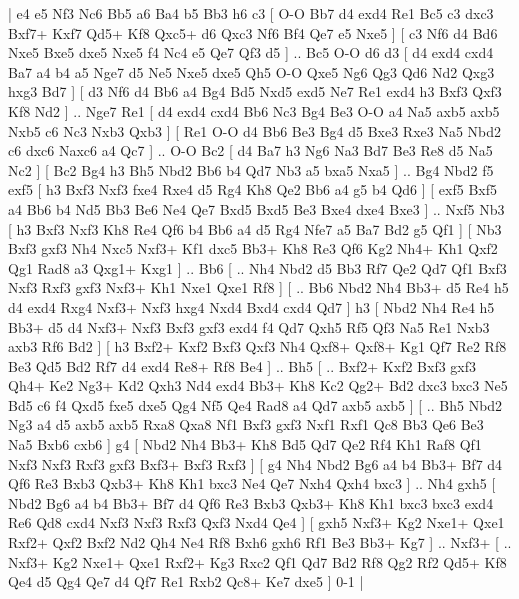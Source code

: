 \makegametitle 
|   e4   e5    Nf3   Nc6    Bb5   a6    Ba4   b5    Bb3   h6    c3 [  O-O Bb7  d4 exd4  Re1 Bc5  c3 dxc3  Bxf7+ Kxf7  Qd5+ Kf8  Qxc5+ d6  Qxc3 Nf6  Bf4 Qe7  e5 Nxe5   ]  [  c3 Nf6  d4 Bd6  Nxe5 Bxe5  dxe5 Nxe5  f4 Nc4  e5 Qe7  Qf3 d5   ] .. Bc5    O-O   d6    d3 [  d4 exd4  cxd4 Ba7  a4 b4  a5 Nge7  d5 Ne5  Nxe5 dxe5  Qh5 O-O  Qxe5 Ng6  Qg3 Qd6  Nd2 Qxg3  hxg3 Bd7   ]  [  d3 Nf6  d4 Bb6  a4 Bg4  Bd5 Nxd5  exd5 Ne7  Re1 exd4  h3 Bxf3  Qxf3 Kf8  Nd2   ] .. Nge7    Re1 [  d4 exd4  cxd4 Bb6  Nc3 Bg4  Be3 O-O  a4 Na5  axb5 axb5  Nxb5 c6  Nc3 Nxb3  Qxb3   ]  [  Re1 O-O  d4 Bb6  Be3 Bg4  d5 Bxe3  Rxe3 Na5  Nbd2 c6  dxc6 Naxc6  a4 Qc7   ] .. O-O    Bc2 [  d4 Ba7  h3 Ng6  Na3 Bd7  Be3 Re8  d5 Na5  Nc2   ]  [  Bc2 Bg4  h3 Bh5  Nbd2 Bb6  b4 Qd7  Nb3 a5  bxa5 Nxa5   ] .. Bg4    Nbd2   f5    exf5 [  h3 Bxf3  Nxf3 fxe4  Rxe4 d5  Rg4 Kh8  Qe2 Bb6  a4 g5  b4 Qd6   ]  [  exf5 Bxf5  a4 Bb6  b4 Nd5  Bb3 Be6  Ne4 Qe7  Bxd5 Bxd5  Be3 Bxe4  dxe4 Bxe3   ] .. Nxf5    Nb3 [  h3 Bxf3  Nxf3 Kh8  Re4 Qf6  b4 Bb6  a4 d5  Rg4 Nfe7  a5 Ba7  Bd2 g5  Qf1   ]  [  Nb3 Bxf3  gxf3 Nh4  Nxc5 Nxf3+  Kf1 dxc5  Bb3+ Kh8  Re3 Qf6  Kg2 Nh4+  Kh1 Qxf2  Qg1 Rad8  a3 Qxg1+  Kxg1   ] .. Bb6 [ .. Nh4  Nbd2 d5  Bb3 Rf7  Qe2 Qd7  Qf1 Bxf3  Nxf3 Rxf3  gxf3 Nxf3+  Kh1 Nxe1  Qxe1 Rf8   ]  [ .. Bb6  Nbd2 Nh4  Bb3+ d5  Re4 h5  d4 exd4  Rxg4 Nxf3+  Nxf3 hxg4  Nxd4 Bxd4  cxd4 Qd7   ]  h3 [  Nbd2 Nh4  Re4 h5  Bb3+ d5  d4 Nxf3+  Nxf3 Bxf3  gxf3 exd4  f4 Qd7  Qxh5 Rf5  Qf3 Na5  Re1 Nxb3  axb3 Rf6  Bd2   ]  [  h3 Bxf2+  Kxf2 Bxf3  Qxf3 Nh4  Qxf8+ Qxf8+  Kg1 Qf7  Re2 Rf8  Be3 Qd5  Bd2 Rf7  d4 exd4  Re8+ Rf8  Be4   ] .. Bh5 [ .. Bxf2+  Kxf2 Bxf3  gxf3 Qh4+  Ke2 Ng3+  Kd2 Qxh3  Nd4 exd4  Bb3+ Kh8  Kc2 Qg2+  Bd2 dxc3  bxc3 Ne5  Bd5 c6  f4 Qxd5  fxe5 dxe5  Qg4 Nf5  Qe4 Rad8  a4 Qd7  axb5 axb5   ]  [ .. Bh5  Nbd2 Ng3  a4 d5  axb5 axb5  Rxa8 Qxa8  Nf1 Bxf3  gxf3 Nxf1  Rxf1 Qc8  Bb3 Qe6  Be3 Na5  Bxb6 cxb6   ]  g4 [  Nbd2 Nh4  Bb3+ Kh8  Bd5 Qd7  Qe2 Rf4  Kh1 Raf8  Qf1 Nxf3  Nxf3 Rxf3  gxf3 Bxf3+  Bxf3 Rxf3   ]  [  g4 Nh4  Nbd2 Bg6  a4 b4  Bb3+ Bf7  d4 Qf6  Re3 Bxb3  Qxb3+ Kh8  Kh1 bxc3  Ne4 Qe7  Nxh4 Qxh4  bxc3   ] .. Nh4    gxh5 [  Nbd2 Bg6  a4 b4  Bb3+ Bf7  d4 Qf6  Re3 Bxb3  Qxb3+ Kh8  Kh1 bxc3  bxc3 exd4  Re6 Qd8  cxd4 Nxf3  Nxf3 Rxf3  Qxf3 Nxd4  Qe4   ]  [  gxh5 Nxf3+  Kg2 Nxe1+  Qxe1 Rxf2+  Qxf2 Bxf2  Nd2 Qh4  Ne4 Rf8  Bxh6 gxh6  Rf1 Be3  Bb3+ Kg7   ] .. Nxf3+    [ .. Nxf3+  Kg2 Nxe1+  Qxe1 Rxf2+  Kg3 Rxc2  Qf1 Qd7  Bd2 Rf8  Qg2 Rf2  Qd5+ Kf8  Qe4 d5  Qg4 Qe7  d4 Qf7  Re1 Rxb2  Qc8+ Ke7  dxe5   ] 0-1  |
